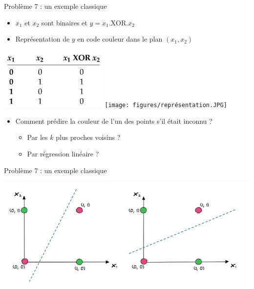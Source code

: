 \documentclass[10pt]{beamer}
\begin{document}
\begin{frame}{Problème 7 : un exemple classique} 

\begin{itemize} 
    \item $x_1$ et $x_2$ sont binaires et $y = x_1 .\mathrm{ XOR }. x_2$
    \item Représentation de $y$ en code couleur dans le plan $(x_1, x_2)$  
\end{itemize}

 \begin{center}
\includegraphics[width=0.4\textwidth]{figures/xor.JPG}%
\hspace{0.15\textwidth}
\texttt{[image: figures/représentation.JPG]}
\end{center} 

\begin{itemize}
    \item Comment prédire la couleur de l'un des points s'il était inconnu ?%
          \begin{itemize}
           \item Par les $k$ plus proches voisins ?  
           \item Par régression linéaire ?  
        \end{itemize} 
\end{itemize}
\end{frame}
\begin{frame}{Problème 7 : un exemple classique} 
 \begin{center}
\includegraphics[width=\textwidth]{figures/regression_xor.JPG} 
\end{center} 

\end{frame}
\end{document}

